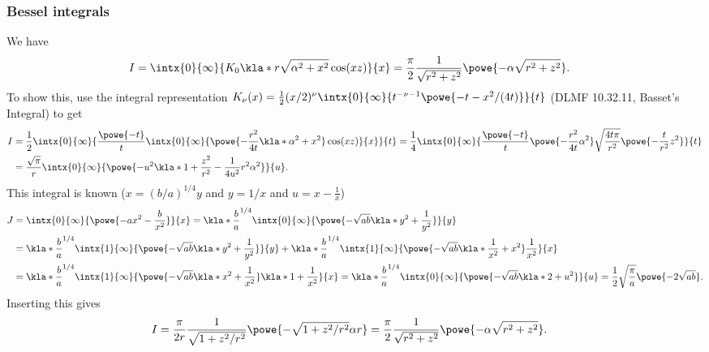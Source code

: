 \documentclass[english, parskip=full]{scrartcl}
\begin{document}
\subsubsection{Bessel integrals}
We have 
\begin{align}
I &= \intx{0}{\infty}{K_0\kla*{r\sqrt{\alpha^2 + x^2}} \cos(xz)}{x} = \frac{\pi}{2} \frac{1}{\sqrt{r^2+z^2}} \powe{-\alpha \sqrt{r^2+z^2}}.
\end{align}
To show this, use the integral representation $K_\nu(x) = \frac{1}{2} (x/2)^\nu \intx{0}{\infty}{t^{-\nu-1} \powe{-t-x^2/(4t)}}{t}$ (DLMF 10.32.11, Basset's Integral) to get
\begin{align}
I &= \frac{1}{2} \intx{0}{\infty}{ \frac{\powe{-t}}{t} \intx{0}{\infty}{ \powe{-\frac{r^2}{4t} \kla*{\alpha^2 + x^2}} \cos(xz) }{x}}{t} = \frac{1}{4} \intx{0}{\infty}{ \frac{\powe{-t}}{t} \powe{-\frac{r^2}{4t}\alpha^2} \sqrt{\frac{4t\pi}{r^2}} \powe{-\frac{t}{r^2}z^2} }{t}\\
&= \frac{\sqrt{\pi}}{r} \intx{0}{\infty}{\powe{-u^2 \kla*{1 + \frac{z^2}{r^2}} - \frac{1}{4u^2} r^2\alpha^2}}{u}.
\end{align}
This integral is known ($x= (b/a)^{1/4}y$ and $y= 1/x$ and $u= x-\frac{1}{x} $) %
\begin{align}
J &= \intx{0}{\infty}{\powe{-ax^2 - \frac{b}{x^2}}}{x} = \kla*{\frac{b}{a}}^{1/4} \intx{0}{\infty}{\powe{-\sqrt{ab} \kla*{y^2 + \frac{1}{y^2}}}}{y}\\
&= \kla*{\frac{b}{a}}^{1/4} \intx{1}{\infty}{\powe{-\sqrt{ab} \kla*{y^2 + \frac{1}{y^2}}}}{y} + \kla*{\frac{b}{a}}^{1/4} \intx{1}{\infty}{\powe{-\sqrt{ab} \kla*{\frac{1}{x^2} + x^2}} \frac{1}{x^2}}{x}\\
&= \kla*{\frac{b}{a}}^{1/4} \intx{1}{\infty}{\powe{-\sqrt{ab} \kla*{x^2 + \frac{1}{x^2}}} \kla*{1 + \frac{1}{x^2}} }{x} = \kla*{\frac{b}{a}}^{1/4} \intx{0}{\infty}{\powe{-\sqrt{ab} \kla*{2+u^2}} }{u} = \frac{1}{2} \sqrt{\frac{\pi}{a}} \powe{-2\sqrt{ab}}.
\end{align}
Inserting this gives
\begin{align}
I &= \frac{\pi}{2r} \frac{1}{\sqrt{1 + z^2/r^2}} \powe{-\sqrt{1 + z^2/r^2} \alpha r} = \frac{\pi}{2} \frac{1}{\sqrt{r^2+z^2}} \powe{-\alpha \sqrt{r^2+z^2}}.
\end{align}
\end{document}
